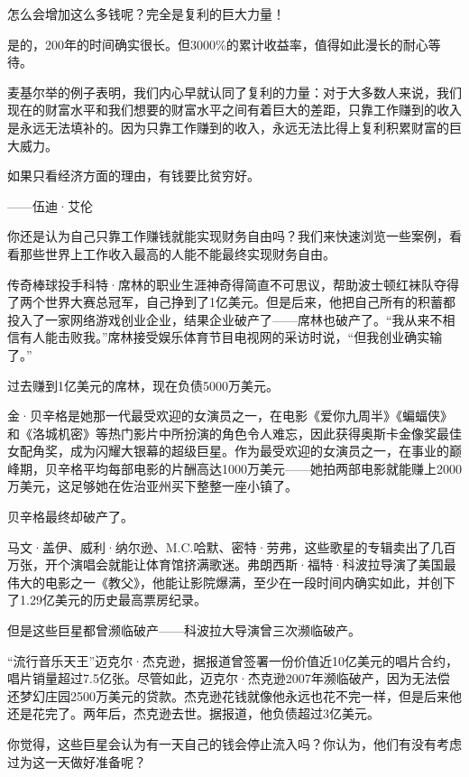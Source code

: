 怎么会增加这么多钱呢？完全是复利的巨大力量！

是的，200年的时间确实很长。但3000\%的累计收益率，值得如此漫长的耐心等待。

麦基尔举的例子表明，我们内心早就认同了复利的力量：对于大多数人来说，我们现在的财富水平和我们想要的财富水平之间有着巨大的差距，只靠工作赚到的收入是永远无法填补的。因为只靠工作赚到的收入，永远无法比得上复利积累财富的巨大威力。

\begin{BookQuote}
如果只看经济方面的理由，有钱要比贫穷好。

\hfill ——伍迪·艾伦
\end{BookQuote}

你还是认为自己只靠工作赚钱就能实现财务自由吗？我们来快速浏览一些案例，看看那些世界上工作收入最高的人能不能最终实现财务自由。

传奇棒球投手科特·席林的职业生涯神奇得简直不可思议，帮助波士顿红袜队夺得了两个世界大赛总冠军，自己挣到了1亿美元。但是后来，他把自己所有的积蓄都投入了一家网络游戏创业企业，结果企业破产了——席林也破产了。“我从来不相信有人能击败我。”席林接受娱乐体育节目电视网的采访时说，“但我创业确实输了。”

过去赚到1亿美元的席林，现在负债5000万美元。

金·贝辛格是她那一代最受欢迎的女演员之一，在电影《爱你九周半》《蝙蝠侠》和《洛城机密》等热门影片中所扮演的角色令人难忘，因此获得奥斯卡金像奖最佳女配角奖，成为闪耀大银幕的超级巨星。作为最受欢迎的女演员之一，在事业的巅峰期，贝辛格平均每部电影的片酬高达1000万美元——她拍两部电影就能赚上2000万美元，这足够她在佐治亚州买下整整一座小镇了。

贝辛格最终却破产了。

马文·盖伊、威利·纳尔逊、M.C.哈默、密特·劳弗，这些歌星的专辑卖出了几百万张，开个演唱会就能让体育馆挤满歌迷。弗朗西斯·福特·科波拉导演了美国最伟大的电影之一《教父》，他能让影院爆满，至少在一段时间内确实如此，并创下了1.29亿美元的历史最高票房纪录。

但是这些巨星都曾濒临破产——科波拉大导演曾三次濒临破产。

“流行音乐天王”迈克尔·杰克逊，据报道曾签署一份价值近10亿美元的唱片合约，唱片销量超过7.5亿张。尽管如此，迈克尔·杰克逊2007年濒临破产，因为无法偿还梦幻庄园2500万美元的贷款。杰克逊花钱就像他永远也花不完一样，但是后来他还是花完了。两年后，杰克逊去世。据报道，他负债超过3亿美元。

你觉得，这些巨星会认为有一天自己的钱会停止流入吗？你认为，他们有没有考虑过为这一天做好准备呢？


